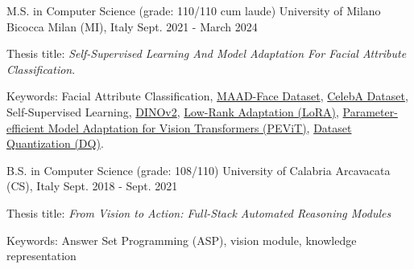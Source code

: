 

\begin{cventries}

\cventry
    {M.S. in Computer Science (grade: 110/110 cum laude)} %
    {University of Milano Bicocca} %
    {Milan (MI), Italy} %
    {Sept. 2021 - March 2024} %
    {
      \begin{cvitems} %
        \item Thesis title: \textit{Self-Supervised Learning And Model Adaptation For Facial Attribute Classification}.
        \item Keywords: Facial Attribute Classification, \href{https://arxiv.org/abs/2012.01030}{MAAD-Face Dataset}, \href{https://arxiv.org/abs/1411.7766}{CelebA Dataset}, Self-Supervised Learning, \href{https://arxiv.org/abs/2304.07193}{DINOv2}, \href{https://arxiv.org/abs/2106.09685}{Low-Rank Adaptation (LoRA)}, \href{https://arxiv.org/abs/2203.16329}{Parameter-efficient Model Adaptation for Vision Transformers (PEViT)}, \href{https://arxiv.org/abs/2308.10524}{Dataset Quantization (DQ)}.
      \end{cvitems}
    }
    
\cventry
    {B.S. in Computer Science (grade: 108/110)} %
    {University of Calabria} %
    {Arcavacata (CS), Italy} %
    {Sept. 2018 - Sept. 2021} %
    {
      \begin{cvitems} %
        \item Thesis title: \textit{From Vision to Action: Full-Stack Automated Reasoning Modules}
        \item Keywords: Answer Set Programming (ASP), vision module, knowledge representation
      \end{cvitems}
    }
    

\end{cventries}
